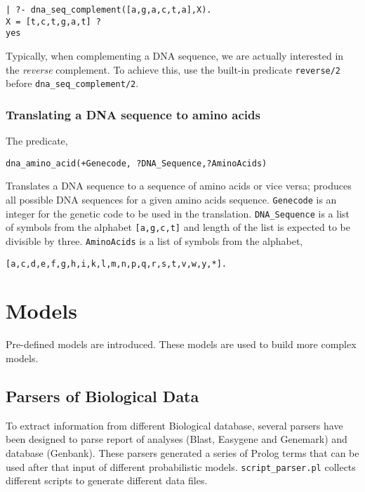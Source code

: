 \documentclass{book}
\begin{document}
\begin{verbatim}
| ?- dna_seq_complement([a,g,a,c,t,a],X).
X = [t,c,t,g,a,t] ?
yes	
\end{verbatim}

Typically, when complementing a DNA sequence, we are actually interested in the \emph{reverse}
complement. To achieve this, use the built-in predicate \texttt{reverse/2} before \texttt{dna\_seq\_complement/2}.

\subsection{Translating a DNA sequence to amino acids}

The predicate, 

\begin{verbatim}
dna_amino_acid(+Genecode, ?DNA_Sequence,?AminoAcids)
\end{verbatim}

Translates a DNA sequence to a sequence of amino acids or vice versa; produces all possible DNA sequences for
a given amino acids sequence. \texttt{Genecode} is an integer for the genetic code to be used in the translation.
\texttt{DNA\_Sequence} is a list of symbols from the alphabet \texttt{[a,g,c,t]} and length of the list is expected
to be divisible by three. \texttt{AminoAcids} is a list of symbols from the alphabet,
\begin{verbatim}
[a,c,d,e,f,g,h,i,k,l,m,n,p,q,r,s,t,v,w,y,*].
\end{verbatim}

\chapter{Models}

Pre-defined models are introduced.  These models are used to build more complex models.

\section{Parsers of Biological Data}

To extract information from different Biological database, several parsers have been designed 
to parse report of analyses (Blast, Easygene and Genemark) and database (Genbank). 
These parsers generated a series of Prolog terms that can be used after that
input of different probabilistic models. \texttt{script\_parser.pl} collects different scripts to generate
different data files.
\end{document}
